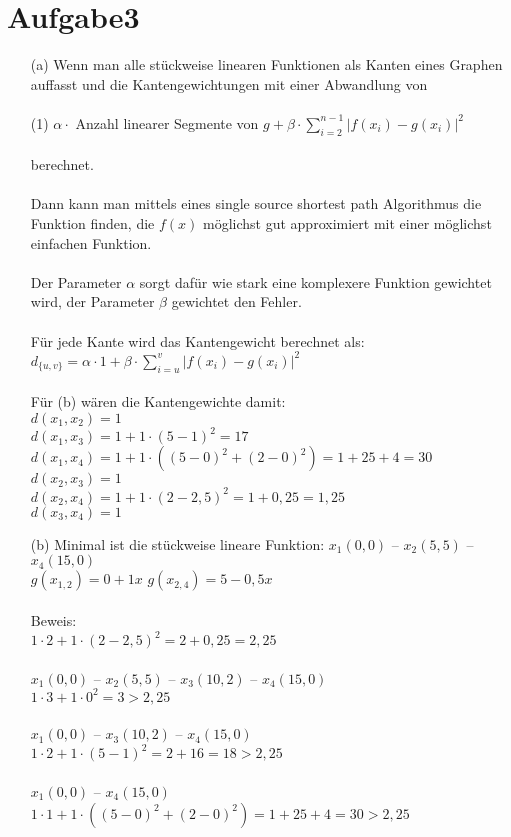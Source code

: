 \documentclass{article}
\begin{document}
\section*{Aufgabe3}
\begin{enumerate}
\item[(a)] Wenn man alle stückweise linearen Funktionen als Kanten eines Graphen auffasst und die Kantengewichtungen mit einer Abwandlung von \\\\
(1) $ \alpha \cdot$ Anzahl linearer Segmente von $g + \beta \cdot \sum_{i=2}^{n-1} \lvert f(x_i)-g(x_i) \lvert ^2$ \\\\
berechnet. \\\\
Dann kann man mittels eines single source shortest path Algorithmus die Funktion finden, die $f(x)$ möglichst gut approximiert mit einer möglichst einfachen Funktion. \\\\
Der Parameter $\alpha$ sorgt dafür wie stark eine komplexere Funktion gewichtet wird, der Parameter $\beta$ gewichtet den Fehler.\\\\
Für jede Kante wird das Kantengewicht berechnet als:\\
 $d_{\{u,v\}} = \alpha \cdot 1 + \beta \cdot \sum_{i=u}^{v} \lvert f(x_i)-g(x_i) \lvert ^2$\\\\
 Für (b) wären die Kantengewichte damit:\\
 $d(x_1,x_2) = 1$ \\
 $d(x_1,x_3) = 1 + 1 \cdot (5-1)^2 = 17$ \\
 $d(x_1,x_4) = 1 + 1 \cdot ((5-0)^2+(2-0)^2) = 1 + 25 + 4 = 30$ \\
 $d(x_2,x_3) = 1$ \\
 $d(x_2,x_4) = 1+1 \cdot (2-2,5)^2 = 1+0,25=1,25$ \\
 $d(x_3,x_4) = 1$\\
\item[(b)] Minimal ist die stückweise lineare Funktion: $x_1 (0,0)$ -- $x_2 (5,5)$ -- $x_4 (15,0)$ \\
$g(x_{1,2}) = 0 + 1x$ $g(x_ {2,4}) = 5 - 0,5x$ \\\\
Beweis: \\
$1 \cdot 2 + 1 \cdot (2-2,5)^2 = 2+ 0,25 = 2,25$\\\\
$x_1 (0,0)$ -- $x_2 (5,5)$ -- $x_3 (10,2)$ -- $x_4 (15,0)$ \\
$1 \cdot 3 + 1 \cdot 0^2=3>2,25$\\\\
$x_1 (0,0)$ -- $x_3 (10,2)$ -- $x_4 (15,0)$ \\
$1 \cdot 2 + 1 \cdot (5-1)^2 = 2 + 16 = 18> 2,25$\\\\
$x_1 (0,0)$ -- $x_4 (15,0)$ \\
$1 \cdot 1 + 1 \cdot ((5-0)^2+(2-0)^2) = 1 + 25 + 4 = 30 >2,25$\\
\end{enumerate}
\end{document}
